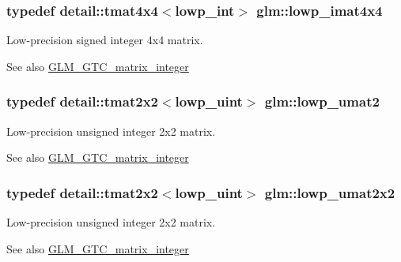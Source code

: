 \subsubsection[{lowp\+\_\+imat4x4}]{\setlength{\rightskip}{0pt plus 5cm}typedef detail\+::tmat4x4$<$lowp\+\_\+int$>$ {\bf glm\+::lowp\+\_\+imat4x4}}\label{group__gtc__matrix__integer_gaac17bd47c20d89a75d933f21e79e3411}
Low-\/precision signed integer 4x4 matrix. \begin{DoxySeeAlso}{See also}
\hyperlink{group__gtc__matrix__integer}{G\+L\+M\+\_\+\+G\+T\+C\+\_\+matrix\+\_\+integer} 
\end{DoxySeeAlso}
\hypertarget{group__gtc__matrix__integer_ga8af5e120231c533b017123546642ef18}{}
\subsubsection[{lowp\+\_\+umat2}]{\setlength{\rightskip}{0pt plus 5cm}typedef detail\+::tmat2x2$<$lowp\+\_\+uint$>$ {\bf glm\+::lowp\+\_\+umat2}}\label{group__gtc__matrix__integer_ga8af5e120231c533b017123546642ef18}
Low-\/precision unsigned integer 2x2 matrix. \begin{DoxySeeAlso}{See also}
\hyperlink{group__gtc__matrix__integer}{G\+L\+M\+\_\+\+G\+T\+C\+\_\+matrix\+\_\+integer} 
\end{DoxySeeAlso}
\hypertarget{group__gtc__matrix__integer_ga2159eb0e37b35ff0ea9a2c909bafaa72}{}
\subsubsection[{lowp\+\_\+umat2x2}]{\setlength{\rightskip}{0pt plus 5cm}typedef detail\+::tmat2x2$<$lowp\+\_\+uint$>$ {\bf glm\+::lowp\+\_\+umat2x2}}\label{group__gtc__matrix__integer_ga2159eb0e37b35ff0ea9a2c909bafaa72}
Low-\/precision unsigned integer 2x2 matrix. \begin{DoxySeeAlso}{See also}
\hyperlink{group__gtc__matrix__integer}{G\+L\+M\+\_\+\+G\+T\+C\+\_\+matrix\+\_\+integer} 
\end{DoxySeeAlso}
\hypertarget{group__gtc__matrix__integer_gacce75aac1f0f0ae3cc18f4cde5db8def}{}
